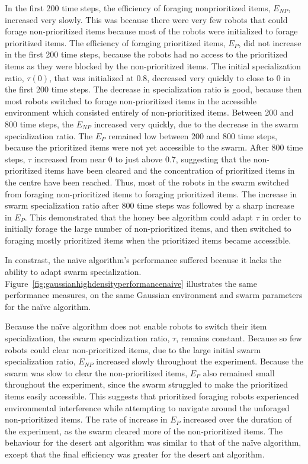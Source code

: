 \documentclass[preprint,12pt]{elsarticle}
\begin{document}
In the first 200 time steps, the efficiency of foraging nonprioritized items, $E_{NP}$, increased very slowly. This was because there were very few robots that could forage non-prioritized items because most of the robots were initialized to forage prioritized items. The efficiency of foraging prioritized items, $E_{P}$, did not increase in the first 200 time steps, because the robots had no access to the prioritized items as they were blocked by the non-prioritized items. The initial specialization ratio, $\tau(0)$, that was initialized at 0.8, decreased very quickly to close to 0 in the first 200 time steps. The decrease in specialization ratio is good, because then most robots switched to forage non-prioritized items in the accessible environment which consisted entirely of non-prioritized items. Between 200 and 800 time steps, the $E_{NP}$ increased very quickly, due to the decrease in the swarm specialization ratio. The $E_{P}$ remained low between 200 and 800 time steps, because the prioritized items were not yet accessible to the swarm. After 800 time steps, $\tau$ increased from near 0 to just above 0.7, suggesting that the non-prioritized items have been cleared and the concentration of prioritized items in the centre have been reached. Thus, most of the robots in the swarm switched from foraging non-prioritized items to foraging prioritized items. The increase in swarm specialization ratio after 800 time steps was followed by a sharp increase in $E_P$. This demonstrated that the honey bee algorithm could adapt $\tau$ in order to initially forage the large number of non-prioritized items, and then switched to foraging mostly prioritized items when the prioritized items became accessible.

In constrast, the na\"ive algorithm's performance suffered because it lacks the ability to adapt swarm specialization. Figure~\ref{fig:gaussianhighdensityperformancenaive} illustrates the same performance measures, on the same Gaussian environment and swarm parameters for the na\"ive algorithm.  

Because the na\"ive algorithm does not enable robots to switch their item specialization, the swarm specialization ratio, $\tau$, remains constant. Because so few robots could clear non-prioritized items, due to the large initial swarm specialization ratio, $E_{NP}$ increased slowly throughout the experiment. Because the swarm was slow to clear the non-prioritized items, $E_P$ also remained small throughout the experiment, since the swarm struggled to make the prioritized items easily accessible. This suggests that prioritized foraging robots experienced environmental interference while attempting to navigate around the unforaged non-prioritized items. The rate of increase in $E_P$ increased over the duration of the experiment, as the swarm cleared more of the non-prioritized items. The behaviour for the desert ant algorithm was similar to that of the na\"ive algorithm, except that the final efficiency was greater for the desert ant algorithm.
\end{document}
